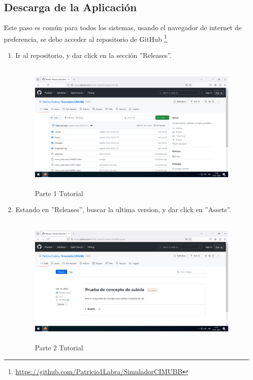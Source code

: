 \subsection*{Descarga de la Aplicación}
Este paso es común para todos los sistemas, usando el navegador de internet de preferencia, se debe acceder al repositorio de GitHub \footnote{\url{https://github.com/Patricio1Labra/SimuladorCIMUBB}}
\begin{enumerate}[label=\arabic*.-]
    \item Ir al repositorio, y dar click en la sección ''Releases''.
\begin{figure}[ht]
    \centering
    \includegraphics[width=10.5cm, height=6.5cm]{figures/TutorialWindows/tutorial (1).png}
    \caption{Parte 1 Tutorial}
    \label{fig:tuto1}
\end{figure}

\clearpage
    \item Estando en ''Releases'', buscar la ultima version, y dar click en ''Assets''.
\begin{figure}[ht]
    \centering
    \includegraphics[width=10.5cm, height=6.5cm]{figures/TutorialWindows/tutorial (2).png}
    \caption{Parte 2 Tutorial}
    \label{fig:tuto2}
\end{figure}


\end{enumerate}
